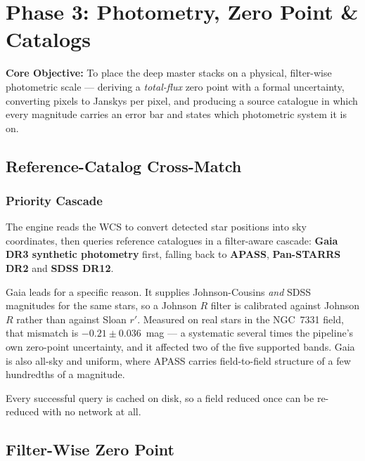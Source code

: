 \documentclass[11pt,a4paper]{article}
\begin{document}
\section{Phase 3: Photometry, Zero Point \& Catalogs}
\textbf{Core Objective:} To place the deep master stacks on a physical,
filter-wise photometric scale --- deriving a \emph{total-flux} zero point with a
formal uncertainty, converting pixels to Janskys per pixel, and producing a
source catalogue in which every magnitude carries an error bar and states which
photometric system it is on.

\subsection{Reference-Catalog Cross-Match}
\subsubsection{Priority Cascade}
The engine reads the WCS to convert detected star positions into sky
coordinates, then queries reference catalogues in a filter-aware cascade:
\textbf{Gaia DR3 synthetic photometry} first, falling back to \textbf{APASS},
\textbf{Pan-STARRS DR2} and \textbf{SDSS DR12}.

Gaia leads for a specific reason. It supplies Johnson-Cousins \emph{and} SDSS
magnitudes for the same stars, so a Johnson $R$ filter is calibrated against
Johnson $R$ rather than against Sloan $r'$. Measured on real stars in the
NGC~7331 field, that mismatch is $-0.21 \pm 0.036$~mag --- a systematic several
times the pipeline's own zero-point uncertainty, and it affected two of the five
supported bands. Gaia is also all-sky and uniform, where APASS carries
field-to-field structure of a few hundredths of a magnitude.

Every successful query is cached on disk, so a field reduced once can be
re-reduced with no network at all.

\subsection{Filter-Wise Zero Point}
\end{document}
